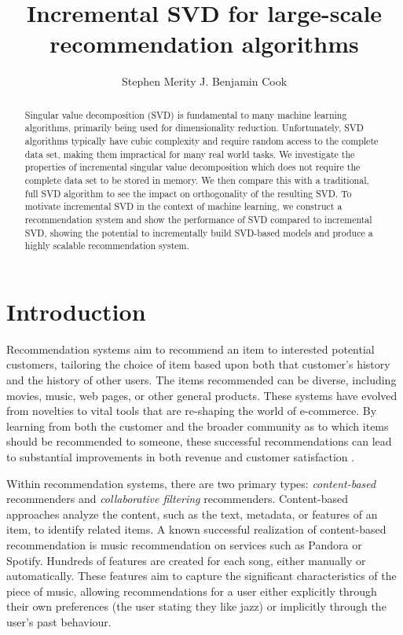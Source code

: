 \documentclass{article} %
\title{Incremental SVD for large-scale recommendation algorithms}
\author{
Stephen Merity
\And
J. Benjamin Cook
}
\begin{document}
\maketitle

\begin{abstract}
Singular value decomposition (SVD) is fundamental to many machine learning algorithms, primarily being used for dimensionality reduction.
Unfortunately, SVD algorithms typically have cubic complexity and require random access to the complete data set, making them impractical for many real world tasks.
We investigate the properties of incremental singular value decomposition which does not require the complete data set to be stored in memory.
We then compare this with a traditional, full SVD algorithm to see the impact on orthogonality of the resulting SVD.
To motivate incremental SVD in the context of machine learning, we construct a recommendation system and show the performance of SVD compared to incremental SVD, showing the potential to incrementally build SVD-based models and produce a highly scalable recommendation system.
\end{abstract}

\section{Introduction}

Recommendation systems aim to recommend an item to interested potential customers, tailoring the choice of item based upon both that customer's history and the history of other users.
The items recommended can be diverse, including movies, music, web pages, or other general products.
These systems have evolved from novelties to vital tools that are re-shaping the world of e-commerce.
By learning from both the customer and the broader community as to which items should be recommended to someone, these successful recommendations can lead to substantial improvements in both revenue and customer satisfaction \citep{schafer1999recommender}.

Within recommendation systems, there are two primary types: \textit{content-based} recommenders and \textit{collaborative filtering} recommenders.
Content-based approaches analyze the content, such as the text, metadata, or features of an item, to identify related items.
A known successful realization of content-based recommendation is music recommendation on services such as Pandora or Spotify.
Hundreds of features are created for each song, either manually or automatically.
These features aim to capture the significant characteristics of the piece of music, allowing recommendations for a user either explicitly through their own preferences (the user stating they like jazz) or implicitly through the user's past behaviour.
\end{document}
